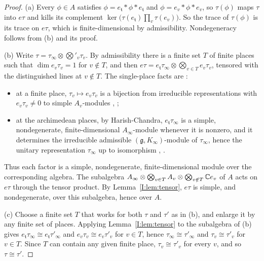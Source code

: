 \begin{proof}
(a) Every $\phi\in A$ satisfies $\phi=e_{\mathfrak t}*\phi*e_{\mathfrak t}$ and $\phi=e_v*\phi*e_v$, so $\tau(\phi)$ maps $\tau$ into $e\tau$ and kills its complement $\ker\big(\tau(e_{\mathfrak t})\prod_v\tau(e_v)\big)$. So the trace of $\tau(\phi)$ is its trace on $e\tau$, which is finite-dimensional by admissibility. Nondegeneracy follows from (b) and its proof.

(b) Write $\tau=\tau_\infty\otimes\bigotimes'_v\tau_v$. By admissibility there is a finite set $T$ of finite places such that $\dim e_v\tau_v=1$ for $v\notin T$, and then $e\tau=e_{\mathfrak t}\tau_\infty\otimes\bigotimes_{v\in T}e_v\tau_v$, tensored with the distinguished lines at $v\notin T$. The single-place facts are \Ev:
\begin{itemize}
\item at a finite place, $\tau_v\mapsto e_v\tau_v$ is a bijection from irreducible representations with $e_v\tau_v\ne0$ to simple $A_v$-modules \cite[\S2]{BZ76}, \cite{Ber84};
\item at the archimedean places, by Harish-Chandra, $e_{\mathfrak t}\tau_\infty$ is a simple, nondegenerate, finite-dimensional $A_\infty$-module whenever it is nonzero, and it determines the irreducible admissible $(\mathfrak g,K_\infty)$-module of $\tau_\infty$, hence the unitary representation $\tau_\infty$ up to isomorphism \cite{HC54}, \cite[\S3.4--3.5]{Wal88}.
\end{itemize}
Thus each factor is a simple, nondegenerate, finite-dimensional module over the corresponding algebra. The subalgebra $A_\infty\otimes\bigotimes_{v\in T}A_v\otimes\bigotimes_{v\notin T}\mathbb{C} e_v$ of $A$ acts on $e\tau$ through the tensor product. By Lemma~\ref{I:lem:tensor}, $e\tau$ is simple, and nondegenerate, over this subalgebra, hence over $A$.

(c) Choose a finite set $T$ that works for both $\tau$ and $\tau'$ as in (b), and enlarge it by any finite set of places. Applying Lemma~\ref{I:lem:tensor} to the subalgebra of (b) gives $e_{\mathfrak t}\tau_\infty\cong e_{\mathfrak t}\tau'_\infty$ and $e_v\tau_v\cong e_v\tau'_v$ for $v\in T$, hence $\tau_\infty\cong\tau'_\infty$ and $\tau_v\cong\tau'_v$ for $v\in T$. Since $T$ can contain any given finite place, $\tau_v\cong\tau'_v$ for every $v$, and so $\tau\cong\tau'$.
\end{proof}

